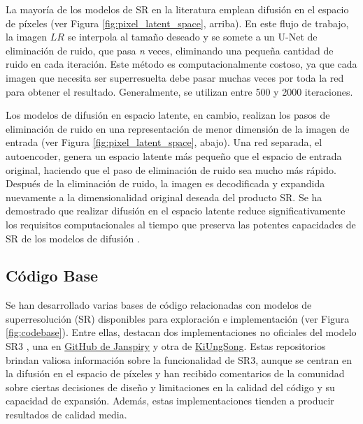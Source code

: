 La mayoría de los modelos de SR en la literatura emplean difusión en el espacio de píxeles (ver Figura \ref{fig:pixel_latent_space}, arriba). En este flujo de trabajo, la imagen $LR$ se interpola al tamaño deseado y se somete a un U-Net de eliminación de ruido, que pasa \textit{n} veces, eliminando una pequeña cantidad de ruido en cada iteración. Este método es computacionalmente costoso, ya que cada imagen que necesita ser superresuelta debe pasar muchas veces por toda la red para obtener el resultado. Generalmente, se utilizan entre 500 y 2000 iteraciones.

Los modelos de difusión en espacio latente, en cambio, realizan los pasos de eliminación de ruido en una representación de menor dimensión de la imagen de entrada (ver Figura \ref{fig:pixel_latent_space}, abajo). Una red separada, el autoencoder, genera un espacio latente más pequeño que el espacio de entrada original, haciendo que el paso de eliminación de ruido sea mucho más rápido. Después de la eliminación de ruido, la imagen es decodificada y expandida nuevamente a la dimensionalidad original deseada del producto SR. Se ha demostrado que realizar difusión en el espacio latente reduce significativamente los requisitos computacionales al tiempo que preserva las potentes capacidades de SR de los modelos de difusión \autocite{rombach2022highresolution}.

\subsection{Código Base}

Se han desarrollado varias bases de código relacionadas con modelos de superresolución (SR) disponibles para exploración e implementación (ver Figura \ref{fig:codebase}). Entre ellas, destacan dos implementaciones no oficiales del modelo SR3 \autocite{saharia2021image}, una en \href{https://github.com/Janspiry/Image-Super-Resolution-via-Iterative-Refinement}{GitHub de Janspiry} y otra de \href{https://github.com/KiUngSong/Generative-Models/tree/main/SR3}{KiUngSong}. Estas repositorios brindan valiosa información sobre la funcionalidad de SR3, aunque se centran en la difusión en el espacio de píxeles y han recibido comentarios de la comunidad sobre ciertas decisiones de diseño y limitaciones en la calidad del código y su capacidad de expansión. Además, estas implementaciones tienden a producir resultados de calidad media.

